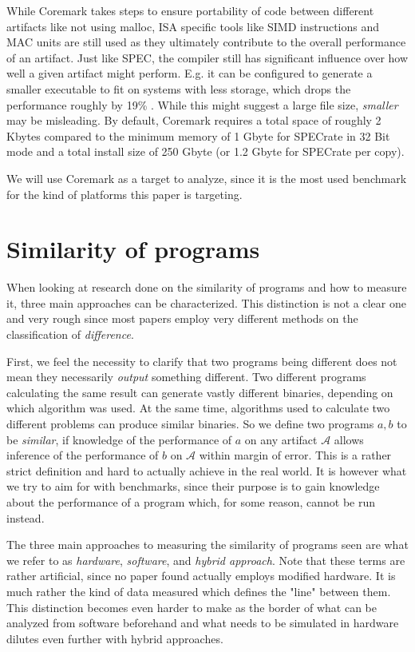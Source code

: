\documentclass[../bachelor_paper.tex]{subfiles}
\begin{document}
While Coremark takes steps to ensure portability of code between different artifacts like not using malloc, \ac{ISA} specific tools like \ac{SIMD} instructions and \ac{MAC unit}s are still used as they ultimately contribute to the overall performance of an artifact. Just like \ac{SPEC}, the compiler still has significant influence over how well a given artifact might perform. E.g. it can be configured to generate a smaller executable to fit on systems with less storage, which drops the performance roughly by 19\% \cite{gal-onExploringCoremarkBenchmark2012}. While this might suggest a large file size, \textit{smaller} may be misleading. By default, Coremark requires a total space of roughly 2 Kbytes compared to the minimum memory of 1 Gbyte for \ac{SPEC}rate in 32 Bit mode and a total install size of 250 Gbyte (or 1.2 Gbyte for \ac{SPEC}rate per copy). \cite{SystemRequirementsCPU}

We will use Coremark as a target to analyze, since it is the most used benchmark for the kind of platforms this paper is targeting.

\section{Similarity of programs}
	\label{ch:theory/similarity}
When looking at research done on the similarity of programs and how to measure it, three main approaches can be characterized. This distinction is not a clear one and very rough since most papers employ very different methods on the classification of \textit{difference}. 

First, we feel the necessity to clarify that two programs being different does not mean they necessarily \textit{output} something different. Two different programs calculating the same result can generate vastly different binaries, depending on which algorithm was used. At the same time, algorithms used to calculate two different problems can produce similar binaries. So we define two programs $a,b$ to be \textit{similar}, if knowledge of the performance of $a$ on any artifact $\mathcal{A}$ allows inference of the performance of $b$ on $\mathcal{A}$ within margin of error. This is a rather strict definition and hard to actually achieve in the real world. It is however what we try to aim for with benchmarks, since their purpose is to gain knowledge about the performance of a program which, for some reason, cannot be run instead.

The three main approaches to measuring the similarity of programs seen are what we refer to as \textit{hardware}, \textit{software}, and \textit{hybrid approach}. Note that these terms are rather artificial, since no paper found actually employs modified hardware. It is much rather the kind of data measured which defines the "line" between them. This distinction becomes even harder to make as the border of what can be analyzed from software beforehand and what needs to be simulated in hardware dilutes even further with hybrid approaches.
\end{document}

